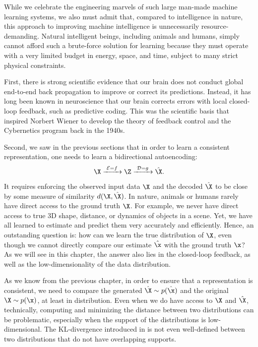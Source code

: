 \documentclass[../../book-main.tex]{subfiles}
\begin{document}
While we celebrate the engineering marvels of such large man-made machine learning systems, we also must admit that, compared to intelligence in nature, this approach to improving machine intelligence is unnecessarily resource-demanding. Natural intelligent beings, including animals and humans, simply cannot afford such a brute-force solution for learning because they must operate with a very limited budget in energy, space, and time, subject to many strict physical constraints. 

First, there is strong scientific evidence that our brain does not conduct global end-to-end back propagation to improve or correct its predictions. Instead, it has long been known in neuroscience that our brain corrects errors with local closed-loop feedback, such as predictive coding. This was the scientific basis that inspired Norbert Wiener to develop the theory of feedback control and the Cybernetics program back in the 1940s. 

Second, we saw in the previous sections that in order to learn a consistent representation, one needs to learn a bidirectional autoencoding:
\begin{equation}
 \X
\xrightarrow{\hspace{1mm} \mathcal{E} = f \hspace{1mm}} \Z  \xrightarrow{\hspace{1mm} \mathcal{D} = g \hspace{1mm}} \hat{\X}.
\end{equation}
It requires enforcing the observed input data $\X$ and the decoded $\hat \X$ to be close by some measure of similarity $d(\X, \hat \X)$. In nature, animals or humans rarely have direct access to the ground truth $\X$. For example, we never have direct access to true 3D shape, distance, or dynamics of objects in a scene. Yet, we have all learned to estimate and predict them very accurately and efficiently. Hence, an outstanding question is: how can we learn the true distribution of $\X$, even though we cannot directly compare our estimate $\hat \x$ with the ground truth $\x$? As we will see in this chapter, the answer also lies in the closed-loop feedback, as well as the low-dimensionality of the data distribution. 






As we know from the previous chapter, in order to ensure that a representation is consistent, we need to compare the generated $\hat \X \sim p(\hat\x)$ and the original $\X \sim p(\x)$, at least in distribution. Even when we do have access to $\X$ and $\hat \X$, technically, computing and minimizing the distance between two distributions can be problematic, especially when the support of the distributions is low-dimensional. The KL-divergence introduced in  is not even well-defined between two distributions that do not have overlapping supports. 
\end{document}
